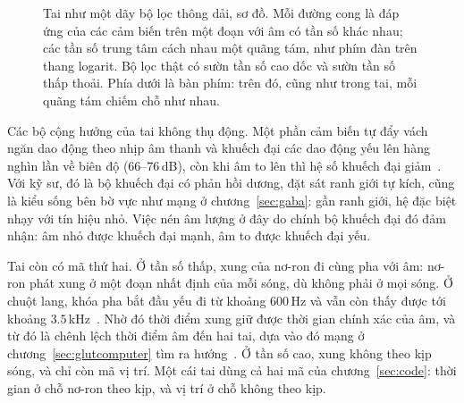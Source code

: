 \begin{figure}[t]
\centering
{}
\caption{Tai như một dãy bộ lọc thông dải, sơ đồ. Mỗi đường cong là đáp ứng của các cảm biến trên một đoạn với âm có tần số khác nhau; các tần số trung tâm cách nhau một quãng tám, như phím đàn trên thang logarit. Bộ lọc thật có sườn tần số cao dốc và sườn tần số thấp thoải. Phía dưới là bàn phím: trên đó, cũng như trong tai, mỗi quãng tám chiếm chỗ như nhau.}
\label{fig:filterbank}
\end{figure}

Các bộ cộng hưởng của tai không thụ động. Một phần cảm biến tự đẩy vách ngăn dao động theo nhịp âm thanh và khuếch đại các dao động yếu lên hàng nghìn lần về biên độ ($66$--$76$\,dB), còn khi âm to lên thì hệ số khuếch đại giảm~\cite{Ruggero1997,Robles2001}. Với kỹ sư, đó là bộ khuếch đại có phản hồi dương, đặt sát ranh giới tự kích, cũng là kiểu sống bên bờ vực như mạng ở chương~\ref{sec:gaba}: gần ranh giới, hệ đặc biệt nhạy với tín hiệu nhỏ. Việc nén âm lượng ở đây do chính bộ khuếch đại đó đảm nhận: âm nhỏ được khuếch đại mạnh, âm to được khuếch đại yếu.

Tai còn có mã thứ hai. Ở tần số thấp, xung của nơ-ron đi cùng pha với âm: nơ-ron phát xung ở một đoạn nhất định của mỗi sóng, dù không phải ở mọi sóng. Ở chuột lang, khóa pha bắt đầu yếu đi từ khoảng $600$\,Hz và vẫn còn thấy được tới khoảng $3.5$\,kHz~\cite{PalmerRussell1986}. Nhờ đó thời điểm xung giữ được thời gian chính xác của âm, và từ đó là chênh lệch thời điểm âm đến hai tai, dựa vào đó mạng ở chương~\ref{sec:glutcomputer} tìm ra hướng~\cite{Grothe2010}. Ở tần số cao, xung không theo kịp sóng, và chỉ còn mã vị trí. Một cái tai dùng cả hai mã của chương~\ref{sec:code}: thời gian ở chỗ nơ-ron theo kịp, và vị trí ở chỗ không theo kịp.

